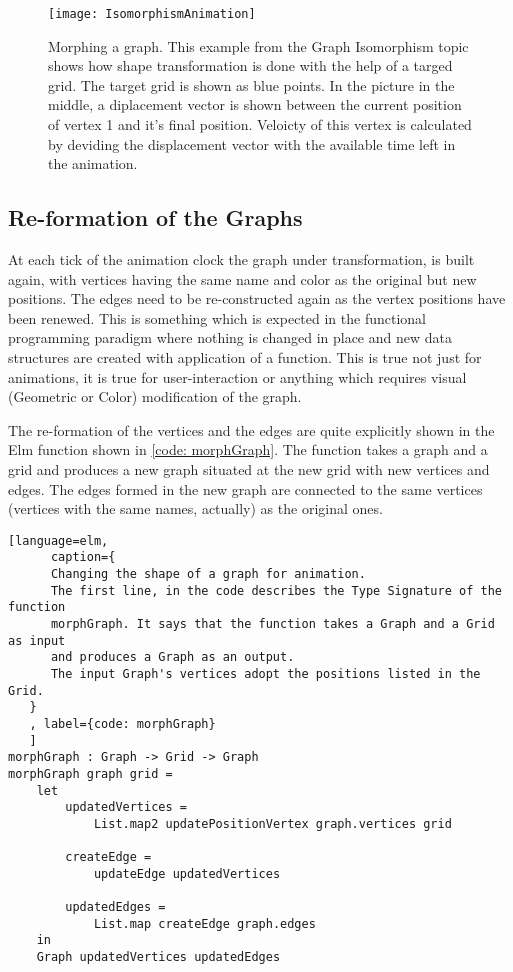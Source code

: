 \begin{figure}[h]
\centering
\texttt{[image: IsomorphismAnimation]}
\caption{
        Morphing a graph. This example from the Graph Isomorphism topic
        shows how shape transformation is done with the help of a targed grid.
        The target grid is shown as blue points. In the picture in the middle,
        a diplacement vector is shown between the current position of vertex 1
        and it's final position. Veloicty of this vertex is calculated by deviding
        the displacement vector with the available time left in the animation.
        }
\label{animationfigure: isomorphism}
\end{figure}

\subsection{Re-formation of the Graphs}
At each tick of the animation clock the graph under transformation, is built
again, with vertices having the same name and color as the original but new
positions. The edges need to be re-constructed again as the vertex positions
have been renewed. This is something which is expected in the functional
programming paradigm where nothing is changed in place and new data structures
are created with application of a function. This is true not just for
animations, it is true for user-interaction or anything which requires visual
(Geometric or Color) modification of the graph.

The re-formation of the vertices and the edges are quite explicitly shown in
the Elm function shown in \autoref{code: morphGraph}. The function takes a
graph and a grid and produces a new graph situated at the new grid with new
vertices and edges.  The edges formed in the new graph are connected to the
same vertices (vertices with the same names, actually) as the original ones.

\begin{lstlisting}[language=elm, 
      caption={
      Changing the shape of a graph for animation.
      The first line, in the code describes the Type Signature of the function
      morphGraph. It says that the function takes a Graph and a Grid as input
      and produces a Graph as an output.
      The input Graph's vertices adopt the positions listed in the Grid.
   }
   , label={code: morphGraph}
   ]
morphGraph : Graph -> Grid -> Graph
morphGraph graph grid =
    let
        updatedVertices =
            List.map2 updatePositionVertex graph.vertices grid

        createEdge =
            updateEdge updatedVertices

        updatedEdges =
            List.map createEdge graph.edges
    in
    Graph updatedVertices updatedEdges

\end{lstlisting}

